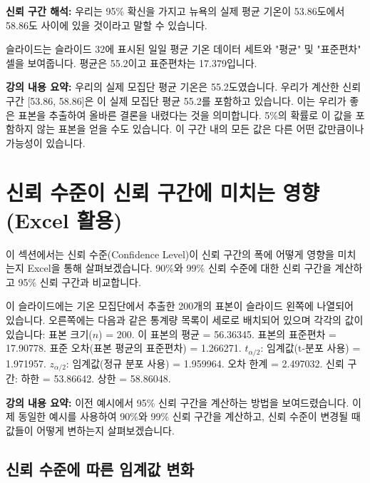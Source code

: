\documentclass[11pt,a4paper]{article}
\begin{document}
\textbf{신뢰 구간 해석:}
우리는 95\% 확신을 가지고 뉴욕의 실제 평균 기온이 53.86도에서 58.86도 사이에 있을 것이라고 말할 수 있습니다.

\begin{tcolorbox}[title=슬라이드 53: 뉴욕 일일 기온 샘플 Excel 시트 (22/22)]
슬라이드는 슬라이드 32에 표시된 일일 평균 기온 데이터 세트와 "평균" 및 "표준편차" 셀을 보여줍니다. 평균은 55.2이고 표준편차는 17.379입니다.
\end{tcolorbox}

\textbf{강의 내용 요약:}
우리의 실제 모집단 평균 기온은 55.2도였습니다. 우리가 계산한 신뢰 구간 [53.86, 58.86]은 이 실제 모집단 평균 55.2를 포함하고 있습니다. 이는 우리가 좋은 표본을 추출하여 올바른 결론을 내렸다는 것을 의미합니다. 5\%의 확률로 이 값을 포함하지 않는 표본을 얻을 수도 있습니다. 이 구간 내의 모든 값은 다른 어떤 값만큼이나 가능성이 있습니다.

\newpage
\section{신뢰 수준이 신뢰 구간에 미치는 영향 (Excel 활용)}

이 섹션에서는 신뢰 수준(Confidence Level)이 신뢰 구간의 폭에 어떻게 영향을 미치는지 Excel을 통해 살펴보겠습니다. 90\%와 99\% 신뢰 수준에 대한 신뢰 구간을 계산하고 95\% 신뢰 구간과 비교합니다.

\begin{tcolorbox}[title=슬라이드 54: 뉴욕 일일 기온 샘플 Excel 시트 (1/13)]
이 슬라이드에는 기온 모집단에서 추출한 200개의 표본이 슬라이드 왼쪽에 나열되어 있습니다. 오른쪽에는 다음과 같은 통계량 목록이 세로로 배치되어 있으며 각각의 값이 있습니다: 표본 크기($n$) = 200. 이 표본의 평균 = 56.36345. 표본의 표준편차 = 17.90778. 표준 오차(표본 평균의 표준편차) = 1.266271. $t_{\alpha/2}$: 임계값(t-분포 사용) = 1.971957. $z_{\alpha/2}$: 임계값(정규 분포 사용) = 1.959964. 오차 한계 = 2.497032. 신뢰 구간: 하한 = 53.86642. 상한 = 58.86048.
\end{tcolorbox}

\textbf{강의 내용 요약:}
이전 예시에서 95\% 신뢰 구간을 계산하는 방법을 보여드렸습니다. 이제 동일한 예시를 사용하여 90\%와 99\% 신뢰 구간을 계산하고, 신뢰 수준이 변경될 때 값들이 어떻게 변하는지 살펴보겠습니다.

\subsection{신뢰 수준에 따른 임계값 변화}
\end{document}
